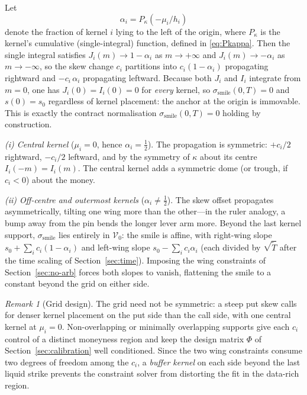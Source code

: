 \documentclass[11pt]{book}
\theoremstyle{plain}
\theoremstyle{definition}
\theoremstyle{remark}
\newtheorem{remark}[theorem]{Remark}
\newcommand{\mln}{m}                             %
\newcommand{\ssm}{\sigma_{\mathrm{smile}}}       %
\begin{document}
Let
\begin{equation}\label{eq:alpha-def}
\alpha_i = P_\kappa\!\left(-\mu_i/h_i\right)
\end{equation}
denote the fraction of kernel $i$ lying to the left of the origin, where
$P_\kappa$ is the kernel's cumulative (single-integral) function, defined in
\eqref{eq:Pkappa}. Then the single integral satisfies $J_i(\mln)\to 1-\alpha_i$
as $\mln\to+\infty$ and $J_i(\mln)\to-\alpha_i$ as $\mln\to-\infty$, so the skew
change $c_i$ partitions into $c_i(1-\alpha_i)$ propagating rightward and
$-c_i\,\alpha_i$ propagating leftward. Because both $J_i$ and $I_i$ integrate
from $\mln = 0$, one has $J_i(0) = I_i(0) = 0$ for \emph{every} kernel, so
$\ssm(0,T) = 0$ and $s(0) = s_0$ regardless of kernel placement: the anchor at
the origin is immovable. This is exactly the contract normalisation $\ssm(0,T)=0$
holding by construction.

\medskip
\noindent\textit{(i) Central kernel} ($\mu_i = 0$, hence $\alpha_i = \tfrac12$).
The propagation is symmetric: $+c_i/2$ rightward, $-c_i/2$ leftward, and by the
symmetry of $\kappa$ about its centre $I_i(-\mln) = I_i(\mln)$. The central
kernel adds a symmetric dome (or trough, if $c_i < 0$) about the money.

\medskip
\noindent\textit{(ii) Off-centre and outermost kernels}
($\alpha_i \neq \tfrac12$). The skew offset propagates asymmetrically, tilting
one wing more than the other---in the ruler analogy, a bump away from the pin
bends the longer lever arm more. Beyond the last kernel support, $\ssm$ lies
entirely in $\mathcal{V}_0$: the smile is affine, with right-wing slope
$s_0 + \sum_i c_i(1-\alpha_i)$ and left-wing slope $s_0 - \sum_i c_i\alpha_i$
(each divided by $\sqrt{\tilde T}$ after the time scaling of
Section~\ref{sec:time}). Imposing the wing constraints of
Section~\ref{sec:no-arb} forces both slopes to vanish, flattening the smile to
a constant beyond the grid on either side.

\begin{remark}[Grid design]\label{rem:grid}
The grid need not be symmetric: a steep put skew calls for denser kernel
placement on the put side than the call side, with one central kernel at
$\mu_i = 0$. Non-overlapping or minimally overlapping supports give each $c_i$
control of a distinct moneyness region and keep the design matrix $\Phi$ of
Section~\ref{sec:calibration} well conditioned. Since the two wing constraints
consume two degrees of freedom among the $c_i$, a \emph{buffer kernel}
on each side beyond the last liquid strike prevents the constraint solver from
distorting the fit in the data-rich region.
\end{remark}
\end{document}
